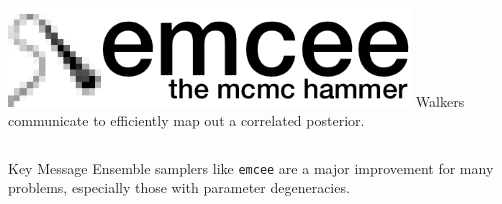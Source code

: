 \documentclass[aspectratio=169]{beamer}
\begin{document}
\begin{frame}
\begin{columns}[T]
        \begin{center}
            \includegraphics[width=0.8\textwidth]{figures/emcee.png} %
            \small Walkers communicate to efficiently map out a correlated posterior.
        \end{center}
    \end{columns}
    
    \begin{alertblock}{Key Message}
        Ensemble samplers like \texttt{emcee} are a major improvement for many problems, especially those with parameter degeneracies.
    \end{alertblock}
\end{frame}
\end{document}
